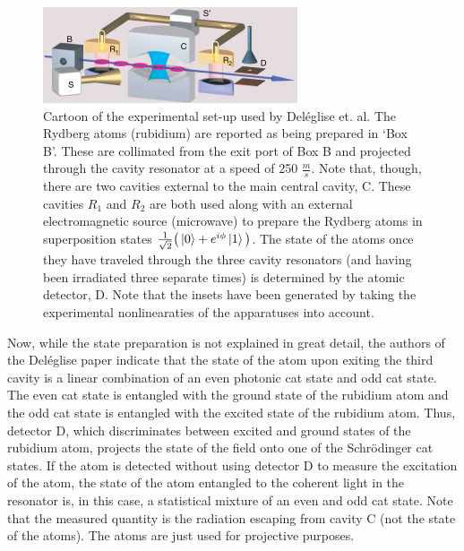 \begin{figure}%
\includegraphics[width=284px,height=107px]{Figures/DelegliseSetUp.png}%
\caption{Cartoon of the experimental set-up used by Del\'{e}glise et. al. The Rydberg atoms (rubidium) are reported as being prepared in `Box B'. These are collimated from the exit port of Box B and projected through the cavity resonator at a speed of 250 $\frac{m}{s}$. Note that, though, there are two cavities external to the main central cavity, C. These cavities $R_1$ and $R_2$ are both used along with an external electromagnetic source (microwave) to prepare the Rydberg atoms in superposition states $\frac{1}{\sqrt{2}}\big(\ket{0}+e^{i\phi}\ket{1}\big)$. The state of the atoms once they have traveled through the three cavity resonators (and having been irradiated three separate times) is determined by the atomic detector, D. Note that the insets have been generated by taking the experimental nonlinearaties of the apparatuses into account.}
\label{DelSetUp}
\end{figure}

Now, while the state preparation is not explained in great detail, the authors of the Del\'eglise paper indicate that the state of the atom upon exiting the third cavity is a linear combination of an even photonic cat state and odd cat state. The even cat state is entangled with the ground state of the rubidium atom and the odd cat state is entangled with the excited state of the rubidium atom. Thus, detector D, which discriminates between excited and ground states of the rubidium atom, projects the state of the field onto one of the Schr\"odinger cat states. If the atom is detected without using detector D to measure the excitation of the atom, the state of the atom entangled to the coherent light in the resonator is, in this case, a statistical mixture of an even and odd cat state. Note that the measured quantity is the radiation escaping from cavity C (not the state of the atoms). The atoms are just used for projective purposes.

